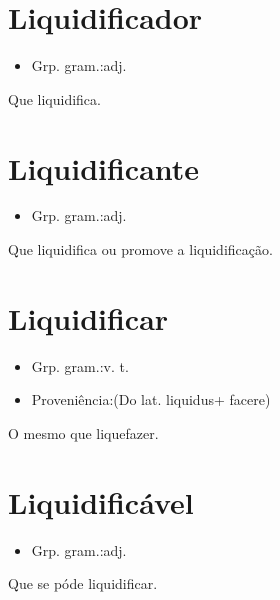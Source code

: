 \section{Liquidificador}
\begin{itemize}
\item {Grp. gram.:adj.}
\end{itemize}
Que liquidifica.
\section{Liquidificante}
\begin{itemize}
\item {Grp. gram.:adj.}
\end{itemize}
Que liquidifica ou promove a liquidificação.
\section{Liquidificar}
\begin{itemize}
\item {Grp. gram.:v. t.}
\end{itemize}
\begin{itemize}
\item {Proveniência:(Do lat. \textunderscore liquidus\textunderscore  + \textunderscore facere\textunderscore )}
\end{itemize}
O mesmo que \textunderscore liquefazer\textunderscore .
\section{Liquidificável}
\begin{itemize}
\item {Grp. gram.:adj.}
\end{itemize}
Que se póde liquidificar.
